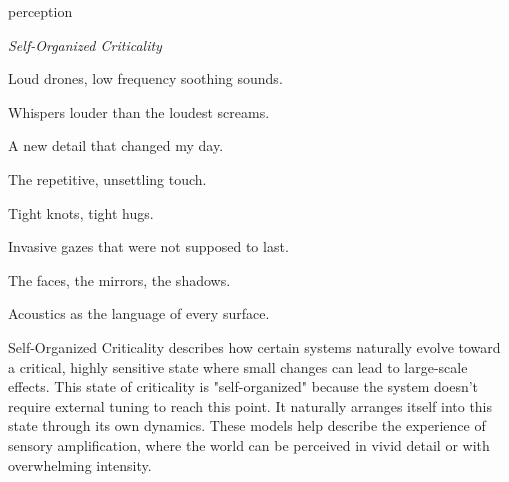 

\begin{center}
\vspace*{\fill}
\Huge perception

\vspace{2cm}

\begin{flushright}
\large
\textit{Self-Organized Criticality}
\end{flushright}

\vspace*{\fill}
\end{center}

\normalsize

Loud drones, low frequency soothing sounds.

Whispers louder than the loudest screams. 

A new detail that changed my day. 

The repetitive, unsettling  touch.

Tight knots, tight hugs.

Invasive gazes that were not supposed to last.

The faces, the mirrors, the shadows. 

Acoustics as the language of every surface.


Self-Organized Criticality describes how certain systems naturally evolve toward a critical, highly sensitive state where small changes can lead to large-scale effects. This state of criticality is "self-organized" because the system doesn’t require external tuning to reach this point. It naturally arranges itself into this state through its own dynamics. These models help describe the experience of sensory amplification, where the world can be perceived in vivid detail or with overwhelming intensity. \citep{adami1993}

